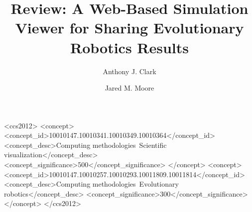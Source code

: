 \documentclass[sigconf,natbib=false,anonymous=false]{acmart}
\begin{document}
\title{Review: A Web-Based Simulation Viewer for Sharing Evolutionary Robotics Results}

\author{Anthony J. Clark}


\author{Jared M. Moore}




%
%
\begin{CCSXML}
<ccs2012>
<concept>
<concept_id>10010147.10010341.10010349.10010364</concept_id>
<concept_desc>Computing methodologies~Scientific visualization</concept_desc>
<concept_significance>500</concept_significance>
</concept>
<concept>
<concept_id>10010147.10010257.10010293.10011809.10011814</concept_id>
<concept_desc>Computing methodologies~Evolutionary robotics</concept_desc>
<concept_significance>300</concept_significance>
</concept>
</ccs2012>
\end{CCSXML}



\maketitle







\printbibliography
\end{document}

